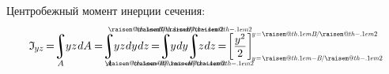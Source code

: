\documentclass[14pt]{extarticle}
\makeatletter
\newcommand{\raisemath}[1]{\mathpalette{\raisem@th{#1}}}
\newcommand{\raisem@th}[3]{\raisebox{#1}{$#2#3$}}
\DeclareMathOperator*{\integral}{\scalerel*{\rotatebox{12}{$\!\textstyle\int\!$}}{\int}} %
\makeatother
\begin{document}
Центробежный момент инерции сечения:
\[
\mathfrak{I}_{\hspace{-0.1ex}\scalebox{.8}{$yz$}} \hspace{-0.25ex}
=\hspace{-0.6ex}
\integral_{A} \hspace{-0.6ex} yz \hspace{.15ex} dA \hspace{-0.1ex}
=\hspace{-0.6ex}
\integral_{A} \hspace{-0.6ex} yz \hspace{.1ex} dy \hspace{.1ex} dz \hspace{-0.2ex}
=\hspace{-0.6ex}
\integral_{\mathclap{\hspace{-.3ex} \scalebox{.6}{$ \raisemath{.1em}{-B} \hspace{-.25ex} / \hspace{-.1ex} \raisemath{-.1em}{2} $}}}^{\mathclap{\scalebox{.6}{$ \raisemath{.1em}{B} \hspace{-.25ex} / \hspace{-.1ex} \raisemath{-.1em}{2} $}}} \hspace{-0.7ex} y \hspace{.1ex} dy \hspace{-.4ex}
\integral_{\mathclap{\hspace{-.3ex} \scalebox{.6}{$ \raisemath{.1em}{-H} \hspace{-.3ex} / \hspace{-.1ex} \raisemath{-.1em}{2} $}}}^{\mathclap{\scalebox{.6}{$ \raisemath{.1em}{H} \hspace{-.3ex} / \hspace{-.1ex} \raisemath{-.1em}{2} $}}} \hspace{-0.7ex} z \hspace{.1ex} dz \hspace{-0.2ex}
=\hspace{-0.4ex}
\left[ \displaystyle\frac{\raisebox{-.1em}{$ y^2 $}}{2} \hspace{.1ex} \right]_{\hspace{-.25ex}\scalebox{.6}{$ y \!=\! \raisemath{.1em}{-B} \hspace{-.25ex} / \hspace{-.1ex} \raisemath{-.1em}{2} $}}^{\hspace{-.25ex} \scalebox{.6}{$ y \!=\! \raisemath{.1em}{B} \hspace{-.25ex} / \hspace{-.1ex} \raisemath{-.1em}{2} $}} \hspace{-.2ex}
\]
\end{document}

